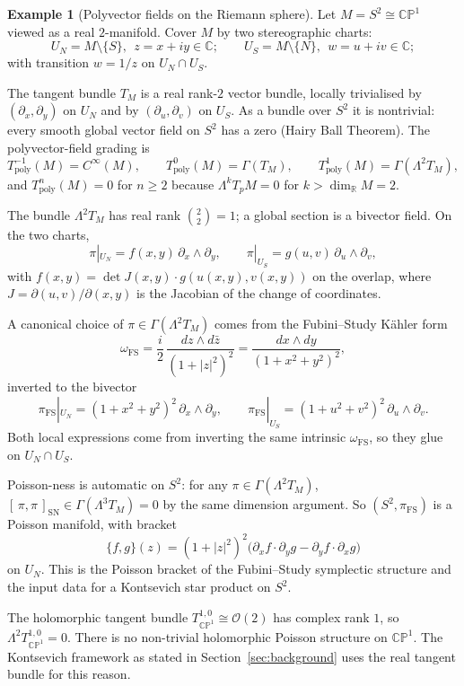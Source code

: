 \documentclass[11pt,a4paper]{article}
\theoremstyle{definition}
\newtheorem{example}[theorem]{Example}
\newcommand{\R}{\mathbb{R}}
\newcommand{\C}{\mathbb{C}}
\newcommand{\Tpoly}{T_{\mathrm{poly}}}
\newcommand{\Cinfty}{C^{\infty}}
\newcommand{\Sch}[2]{[\,#1,#2\,]_{\mathrm{SN}}}
\begin{document}
\begin{example}[Polyvector fields on the Riemann sphere]
\label{ex:polyvectors-cp1}
Let $M = S^{2} \cong \mathbb{CP}^{1}$ viewed as a real $2$-manifold.
Cover $M$ by two stereographic charts:
\[
U_{N} = M \setminus \{S\}, \ \ z = x+iy \in \C;
\qquad
U_{S} = M \setminus \{N\}, \ \ w = u+iv \in \C;
\]
with transition $w = 1/z$ on $U_{N} \cap U_{S}$.

The tangent bundle $T_M$ is a real rank-$2$ vector bundle, locally
trivialised by $(\partial_x, \partial_y)$ on $U_{N}$ and by
$(\partial_u, \partial_v)$ on $U_{S}$. As a bundle over $S^{2}$ it
is nontrivial: every smooth global vector field on $S^{2}$ has a
zero (Hairy Ball Theorem). The polyvector-field grading is
\[
\Tpoly^{-1}(M) = \Cinfty(M),\qquad
\Tpoly^{0}(M) = \Gamma(T_M),\qquad
\Tpoly^{1}(M) = \Gamma(\Lambda^{2} T_M),
\]
and $\Tpoly^{n}(M) = 0$ for $n \ge 2$ because
$\Lambda^{k} T_{p}M = 0$ for $k > \dim_{\R} M = 2$.

The bundle $\Lambda^{2}T_M$ has real rank $\binom{2}{2} = 1$; a global
section is a bivector field. On the two charts,
\[
\pi|_{U_{N}} = f(x,y)\, \partial_x \wedge \partial_y,
\qquad
\pi|_{U_{S}} = g(u,v)\, \partial_u \wedge \partial_v,
\]
with $f(x,y) = \det J(x,y) \cdot g(u(x,y), v(x,y))$ on the overlap,
where $J = \partial(u,v)/\partial(x,y)$ is the Jacobian of the change
of coordinates.

A canonical choice of $\pi \in \Gamma(\Lambda^{2}T_M)$ comes from the
Fubini--Study K\"ahler form
\[
\omega_{\mathrm{FS}}
= \frac{i}{2}\,\frac{dz \wedge d\bar z}{(1+|z|^{2})^{2}}
= \frac{dx \wedge dy}{(1+x^{2}+y^{2})^{2}},
\]
inverted to the bivector
\[
\pi_{\mathrm{FS}}|_{U_{N}}
= (1+x^{2}+y^{2})^{2}\, \partial_x \wedge \partial_y,
\qquad
\pi_{\mathrm{FS}}|_{U_{S}}
= (1+u^{2}+v^{2})^{2}\, \partial_u \wedge \partial_v.
\]
Both local expressions come from inverting the same intrinsic
$\omega_{\mathrm{FS}}$, so they glue on $U_{N} \cap U_{S}$.

Poisson-ness is automatic on $S^{2}$: for any
$\pi \in \Gamma(\Lambda^{2}T_M)$, $\Sch{\pi}{\pi} \in
\Gamma(\Lambda^{3} T_M) = 0$ by the same dimension argument. So
$(S^{2}, \pi_{\mathrm{FS}})$ is a Poisson manifold, with bracket
\[
\{f, g\}(z)
= (1+|z|^{2})^{2}
\bigl(\partial_x f \cdot \partial_y g
    - \partial_y f \cdot \partial_x g\bigr)
\]
on $U_{N}$. This is the Poisson bracket of the Fubini--Study
symplectic structure and the input data for a Kontsevich star
product on $S^{2}$.

The holomorphic tangent bundle $T_{\mathbb{CP}^{1}}^{1,0} \cong
\mathcal{O}(2)$ has complex rank $1$, so
$\Lambda^{2} T_{\mathbb{CP}^{1}}^{1,0} = 0$. There is no non-trivial
holomorphic Poisson structure on $\mathbb{CP}^{1}$. The Kontsevich
framework as stated in Section~\ref{sec:background} uses the real
tangent bundle for this reason.
\end{example}
\end{document}
